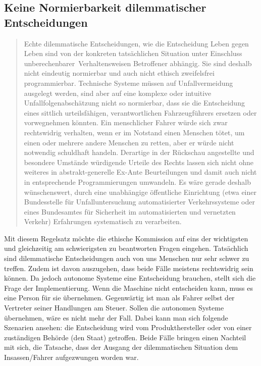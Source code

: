 \documentclass[twoside,a4paper,12pt]{article}
\begin{document}
\subsection{Keine Normierbarkeit dilemmatischer Entscheidungen} \label{NichtNormierbarkeitDilemmatischerEntscheidungen}
\begin{quote}
\glqq
Echte dilemmatische Entscheidungen, wie die Entscheidung Leben gegen Leben sind von
der konkreten tatsächlichen Situation unter Einschluss \glqq unberechenbarer\grqq\ Verhaltensweisen Betroffener abhängig. 
Sie sind deshalb nicht eindeutig normierbar und auch nicht
ethisch zweifelsfrei programmierbar. Technische Systeme müssen auf Unfallvermeidung
ausgelegt werden, sind aber auf eine komplexe oder intuitive Unfallfolgenabschätzung
nicht so normierbar, dass sie die Entscheidung eines sittlich urteilsfähigen, verantwortlichen Fahrzeugführers ersetzen 
oder vorwegnehmen könnten. Ein menschlicher Fahrer
würde sich zwar rechtswidrig verhalten, wenn er im Notstand einen Menschen tötet, um
einen oder mehrere andere Menschen zu retten, aber er würde nicht notwendig schuldhaft handeln. Derartige in der Rückschau 
angestellte und besondere Umstände würdigende Urteile des Rechts lassen sich nicht ohne weiteres in abstrakt-generelle 
Ex-Ante Beurteilungen und damit auch nicht in entsprechende Programmierungen umwandeln.
Es wäre gerade deshalb wünschenswert, durch eine unabhängige öffentliche Einrichtung
(etwa einer Bundesstelle für Unfalluntersuchung automatisierter Verkehrssysteme oder
eines Bundesamtes für Sicherheit im automatisierten und vernetzten Verkehr) Erfahrungen systematisch zu verarbeiten.\grqq\mbox{~\cite[S. 11]{ek}}
\end{quote}
Mit diesem Regelsatz möchte die ethische Kommission auf eins der wichtigsten und gleichzeitig am schwierigsten zu beantworten Fragen eingehen. Tatsächlich sind dilemmatische Entscheidungen auch von uns Menschen nur sehr schwer zu treffen. Zudem ist davon auszugehen, dass beide Fälle meistens rechtswidrig sein können.
Da jedoch autonome Systeme eine Entscheidung brauchen, stellt sich die Frage der Implementierung. Wenn die Maschine nicht entscheiden kann, muss es eine Person für sie übernehmen. Gegenwärtig ist man als Fahrer selbst der Vertreter seiner Handlungen am Steuer. Sollen die autonomen Systeme übernehmen, wäre es nicht mehr der Fall. Dabei kann man sich folgende Szenarien ansehen: die Entscheidung wird vom Produkthersteller oder von einer zuständigen Behörde (den Staat) getroffen. Beide Fälle bringen einen  Nachteil mit sich, die Tatsache, dass der Ausgang der dilemmatischen Situation dem Insassen/Fahrer aufgezwungen worden war.
\end{document}
